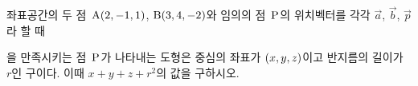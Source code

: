 좌표공간의 두 점~$\mathrm{A}(2{,}\mkern3mu\mathopen{}-1{,}\mkern3mu\mathopen{}1)$, $\mathrm{B}(3{,}\mkern3mu\mathopen{}4{,}\mkern3mu\mathopen{}-2)$와 임의의 점~$\mathrm{P}$의 위치벡터를 각각 $\vec{a}$, $\vec{b}$, $\vec{p}$라 할 때 \par\smallskip{}\par\smallskip\noindent 을 만족시키는 점~$\mathrm{P}$가 나타내는 도형은 중심의 좌표가 $(x{,}\mkern3mu\mathopen{}y{,}\mkern3mu\mathopen{}z)$이고 반지름의 길이가 $r$인 구이다. 이때 $x+y+z+r^2$의 값을 구하시오.
